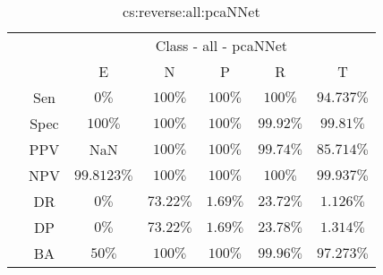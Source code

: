 \begin{table}[!ht]
	\centering
	\begin{tabular}{|c|c|c|c|c|c|c|}
		\cline{3-7}
		\multicolumn{2}{c|}{} & \multicolumn{5}{c|}{Class - all - pcaNNet} \\ \cline{3-7}
		\multicolumn{2}{c|}{} & E & N & P & R & T \\ \hline
		\multirow{7}{*}{\rotatebox{90}{Statistics}} & Sen & $0\%$ & $100\%$ & $100\%$ & $100\%$ & $94.737\%$ \\ \cline{2-7}
		 & Spec & $100\%$ & $100\%$ & $100\%$ & $99.92\%$ & $99.81\%$ \\ \cline{2-7}
		 & PPV & NaN & $100\%$ & $100\%$ & $99.74\%$ & $85.714\%$ \\ \cline{2-7}
		 & NPV & $99.8123\%$ & $100\%$ & $100\%$ & $100\%$ & $99.937\%$ \\ \cline{2-7}
		 & DR & $0\%$ & $73.22\%$ & $1.69\%$ & $23.72\%$ & $1.126\%$ \\ \cline{2-7}
		 & DP & $0\%$ & $73.22\%$ & $1.69\%$ & $23.78\%$ & $1.314\%$ \\ \cline{2-7}
		 & BA & $50\%$ & $100\%$ & $100\%$ & $99.96\%$ & $97.273\%$ \\ \hline
	\end{tabular}
	\caption{cs:reverse:all:pcaNNet}
	\label{tab:cs:reverse:all:pcaNNet}
\end{table}
